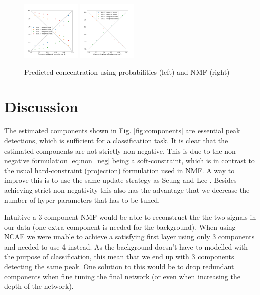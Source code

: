 \documentclass{article}
\begin{document}
\begin{figure}[H]
	\includegraphics[width=0.25\textwidth]{DNN_pred_conc_prob_2.png} \hspace*{-.5cm}
	\includegraphics[width=0.25\textwidth]{nmf_pred_conc_2.png}
	\caption{Predicted concentration using probabilities (left) and NMF (right)}
	\label{fig:comparison}
\end{figure}
\section{Discussion}
\label{sec:discussion}
The estimated components shown in Fig. \ref{fig:components} are essential peak detections, which is sufficient for a classification task. It is clear that the estimated components are not strictly non-negative. This is due to the non-negative formulation \eqref{eq:non_neg} being a soft-constraint, which is in contrast to the usual hard-constraint (projection) formulation used in NMF. A way to improve this is to use the same update strategy as Seung and Lee \cite{Seung1999}. Besides achieving strict non-negativity this also has the advantage that we decrease the number of hyper parameters that has to be tuned.

Intuitive a 3 component NMF would be able to reconstruct the the two signals in our data (one extra component is needed for the background). When using NCAE we were unable to achieve a satisfying first layer using only 3 components and needed to use 4 instead. As the background doesn't have to modelled with the purpose of classification, this mean that we end up with 3 components detecting the same peak. One solution to this would be to drop redundant components when fine tuning the final network (or even when increasing the depth of the network).
\end{document}

